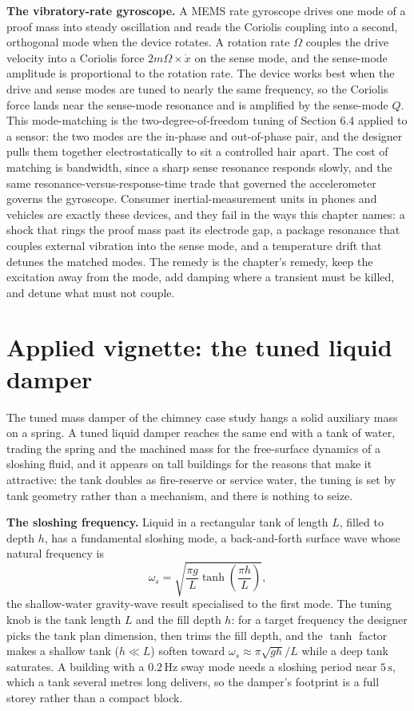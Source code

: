 \textbf{The vibratory-rate gyroscope.} A MEMS rate gyroscope drives one
mode of a proof mass into steady oscillation and reads the Coriolis
coupling into a second, orthogonal mode when the device rotates. A
rotation rate $\Omega$ couples the drive velocity into a Coriolis force
$2m\Omega\times\dot{x}$ on the sense mode, and the sense-mode amplitude
is proportional to the rotation rate. The device works best when the
drive and sense modes are tuned to nearly the same frequency, so the
Coriolis force lands near the sense-mode resonance and is amplified by
the sense-mode $Q$. This mode-matching is the two-degree-of-freedom
tuning of Section 6.4 applied to a sensor: the two modes are the
in-phase and out-of-phase pair, and the designer pulls them together
electrostatically to sit a controlled hair apart. The cost of matching
is bandwidth, since a sharp sense resonance responds slowly, and the
same resonance-versus-response-time trade that governed the accelerometer
governs the gyroscope. Consumer inertial-measurement units in phones and
vehicles are exactly these devices, and they fail in the ways this
chapter names: a shock that rings the proof mass past its electrode gap,
a package resonance that couples external vibration into the sense mode,
and a temperature drift that detunes the matched modes. The remedy is
the chapter's remedy, keep the excitation away from the mode, add
damping where a transient must be killed, and detune what must not
couple.

\section{Applied vignette: the tuned liquid damper}

The tuned mass damper of the chimney case study hangs a solid auxiliary
mass on a spring. A tuned liquid damper reaches the same end with a tank
of water, trading the spring and the machined mass for the free-surface
dynamics of a sloshing fluid, and it appears on tall buildings for the
reasons that make it attractive: the tank doubles as fire-reserve or
service water, the tuning is set by tank geometry rather than a
mechanism, and there is nothing to seize.

\textbf{The sloshing frequency.} Liquid in a rectangular tank of length
$L$, filled to depth $h$, has a fundamental sloshing mode, a
back-and-forth surface wave whose natural frequency is
\[
\omega_s = \sqrt{\frac{\pi g}{L}\tanh\!\left(\frac{\pi h}{L}\right)},
\]
the shallow-water gravity-wave result specialised to the first mode. The
tuning knob is the tank length $L$ and the fill depth $h$: for a target
frequency the designer picks the tank plan dimension, then trims the fill
depth, and the $\tanh$ factor makes a shallow tank ($h\ll L$) soften
toward $\omega_s\approx\pi\sqrt{gh}/L$ while a deep tank saturates. A
building with a $0.2\,\si{\hertz}$ sway mode needs a sloshing period near
$5\,\si{\second}$, which a tank several metres long delivers, so the
damper's footprint is a full storey rather than a compact block.

